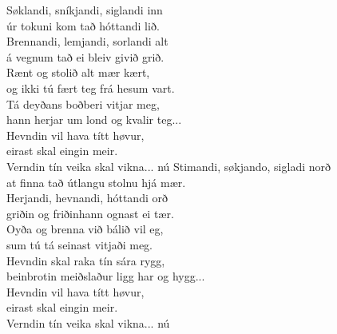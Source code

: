 \clearpage
{}

Søklandi, sníkjandi, siglandi inn\\
úr tokuni kom tað hóttandi lið.\\
Brennandi, lemjandi, sorlandi alt\\
á vegnum tað ei bleiv givið grið.\\
Rænt og stolið alt mær kært,\\
og ikki tú fært teg frá hesum vart.\\
Tá deyðans boðberi vitjar meg,\\
hann herjar um lond og kvalir teg...
\hops
{} {}\\
 Hevndin vil hava títt høvur,\\
 eirast skal eingin meir.\\
 Verndin tín veika skal vikna... nú
\hops
Stimandi, søkjando, sigladi norð\\
at finna tað útlangu stolnu hjá mær.\\
Herjandi, hevnandi, hóttandi orð\\
griðin og friðinhann ognast ei tær.\\
Oyða og brenna við bálið vil eg,\\
sum tú tá seinast vitjaði meg.\\
Hevndin skal raka tín sára rygg,\\
beinbrotin meiðslaður ligg har og hygg...
\hops
{} {}\\
 Hevndin vil hava títt høvur,\\
 eirast skal eingin meir.\\
 Verndin tín veika skal vikna... nú

\clearpage
{}

